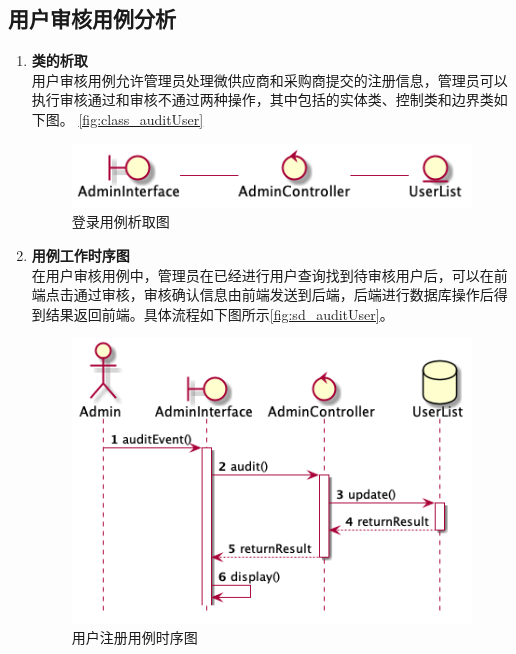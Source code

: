 	\subsection{用户审核用例分析} %
	\label{sub:用户审核用例分析}
	\begin{enumerate}
		\item \textbf{类的析取} \\
		用户审核用例允许管理员处理微供应商和采购商提交的注册信息，管理员可以执行审核通过和审核不通过两种操作，其中包括的实体类、控制类和边界类如下图。
		\autoref{fig:class_auditUser}
		\begin{figure}[htp]
		    \centering
		    \includegraphics[width=12cm]{misc/figure_src/class_diagram/auditUser.png}
		    \caption{登录用例析取图}
		    \label{fig:class_auditUser}
		\end{figure}

		\item \textbf{用例工作时序图} \\
		在用户审核用例中，管理员在已经进行用户查询找到待审核用户后，可以在前端点击通过审核，审核确认信息由前端发送到后端，后端进行数据库操作后得到结果返回前端。具体流程如下图所示\autoref{fig:sd_auditUser}。

		\begin{figure}[htp]
		    \centering
		    \includegraphics[width=12cm]{misc/figure_src/sequence_diagram/sd_audit_user.png}
		    \caption{用户注册用例时序图}
		    \label{fig:sd_auditUser}
		\end{figure}

	\end{enumerate}

